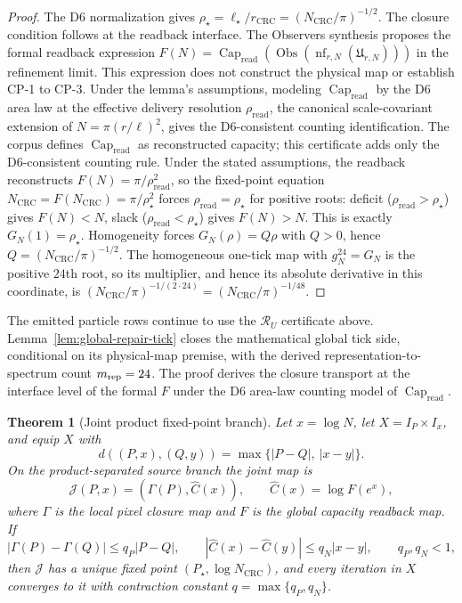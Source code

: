 \documentclass[11pt]{article}
\newtheorem{theorem}{Theorem}[section]
\begin{document}
\begin{proof}
The D6 normalization gives
\(\rho_\star=\ell_\star/r_{\mathrm{CRC}}=(N_{\mathrm{CRC}}/\pi)^{-1/2}\). The closure
condition follows at the readback interface. The Observers synthesis proposes the formal readback
expression
\(F(N)=\operatorname{Cap}_{\mathrm{read}}(\operatorname{Obs}(\operatorname{nf}_{r,N}(\mathfrak
U_{r,N})))\) in the refinement limit. This expression does not construct the physical map or
establish CP-1 to CP-3. Under the lemma's assumptions, modeling
\(\operatorname{Cap}_{\mathrm{read}}\) by the D6 area
law at the effective delivery resolution \(\rho_{\mathrm{read}}\), the canonical
scale-covariant extension of \(N=\pi(r/\ell)^2\), gives the D6-consistent counting
identification. The corpus
defines \(\operatorname{Cap}_{\mathrm{read}}\) as reconstructed capacity; this certificate adds
only the D6-consistent counting rule. Under the stated assumptions, the readback reconstructs
\(F(N)=\pi/\rho_{\mathrm{read}}^2\), so the fixed-point equation
\(N_{\mathrm{CRC}}=F(N_{\mathrm{CRC}})=\pi/\rho_\star^2\) forces
\(\rho_{\mathrm{read}}=\rho_\star\) for positive roots: deficit
(\(\rho_{\mathrm{read}}>\rho_\star\)) gives \(F(N)<N\), slack
(\(\rho_{\mathrm{read}}<\rho_\star\)) gives \(F(N)>N\). This is exactly
\(G_N(1)=\rho_\star\). Homogeneity forces \(G_N(\rho)=Q\rho\) with \(Q>0\), hence
\(Q=(N_{\mathrm{CRC}}/\pi)^{-1/2}\). The homogeneous one-tick map with
\(g_N^{24}=G_N\) is the positive \(24\)th root, so its multiplier, and hence its absolute
derivative in this coordinate, is
\((N_{\mathrm{CRC}}/\pi)^{-1/(2\cdot24)}=(N_{\mathrm{CRC}}/\pi)^{-1/48}\).
\end{proof}

The emitted particle rows continue to use the \(\mathcal R_U\) certificate above.
Lemma~\ref{lem:global-repair-tick} closes the mathematical global tick side, conditional on its
physical-map premise, with the derived
representation-to-spectrum count \(m_{\rm rep}=24\). The proof derives the closure transport at
the interface level of the formal \(F\) under the D6 area-law counting model of
\(\operatorname{Cap}_{\mathrm{read}}\).

\begin{theorem}[Joint product fixed-point branch]\label{thm:joint-pn-product}
Let \(x=\log N\), let \(X=I_P\times I_x\), and equip \(X\) with
\[
d((P,x),(Q,y))=\max\{|P-Q|,\ |x-y|\}.
\]
On the product-separated source branch the joint map is
\[
\mathcal J(P,x)=(\Gamma(P),\widehat C(x)),
\qquad
\widehat C(x)=\log F(e^x),
\]
where \(\Gamma\) is the local pixel closure map and \(F\) is the global capacity readback map.
If
\[
|\Gamma(P)-\Gamma(Q)|\le q_P|P-Q|,
\qquad
|\widehat C(x)-\widehat C(y)|\le q_N|x-y|,
\qquad q_P,q_N<1,
\]
then \(\mathcal J\) has a unique fixed point \((P_\star,\log N_{\mathrm{CRC}})\), and every
iteration in \(X\) converges to it with contraction constant \(q=\max\{q_P,q_N\}\).
\end{theorem}
\end{document}

